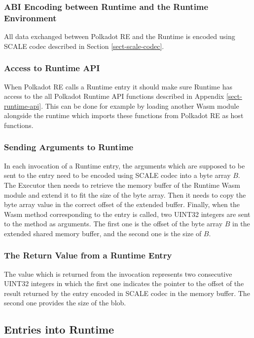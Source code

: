 \documentclass{article}
\begin{document}
\subsubsection{ABI Encoding between Runtime and the Runtime
Environment}\label{sect-abi-encoding}

All data exchanged between Polkadot RE and the Runtime is encoded using SCALE
codec described in Section \ref{sect-scale-codec}.

\subsubsection{Access to Runtime API}

When Polkadot RE calls a Runtime entry it should make sure Runtime has access
to the all Polkadot Runtime API functions described in Appendix
\ref{sect-runtime-api}. This can be done for example by loading another Wasm
module alongside the runtime which imports these functions from Polkadot RE as
host functions.

\subsubsection{Sending Arguments to Runtime \ }

In each invocation of a Runtime entry, the arguments which are supposed to be
sent to the entry need to be encoded using SCALE codec into a byte array $B$.
The Executor then needs to retrieve the memory buffer of the Runtime Wasm
module and extend it to fit the size of the byte array. Then it needs to copy
the byte array value in the correct offset of the extended buffer. Finally,
when the Wasm method corresponding to the entry is called, two UINT32 integers
are sent to the method as arguments. The first one is the offset of the byte
array $B$ in the extended shared memory buffer, and the second one is the size
of $B$.

\subsubsection{The Return Value from a Runtime Entry}

The value which is returned from the invocation represents two consecutive
UINT32 integers in which the first one indicates the pointer to the offset of
the result returned by the entry encoded in SCALE codec in the memory buffer.
The second one provides the size of the blob.

\subsection{Entries into Runtime}\label{sect-runtime-entries}
\end{document}
